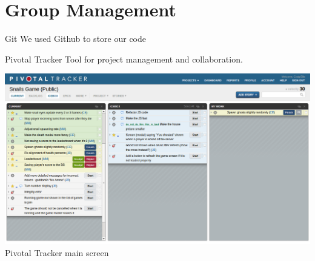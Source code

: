 \documentclass{beamer}
\begin{document}
\section{Group Management}

\begin{frame}{Git}
  We used Github to store our code
\end{frame}

\begin{frame}{Pivotal Tracker}
  Tool for project management and collaboration. \\ 
  \begin{center}
    \includegraphics[scale=0.25]{pivotal.png} \\
    Pivotal Tracker main screen
  \end{center}
\end{frame}
\end{document}
